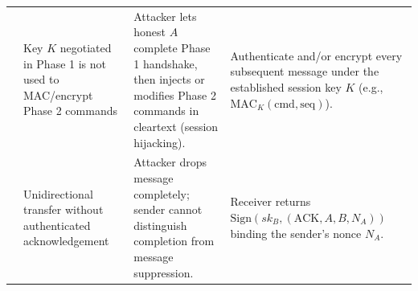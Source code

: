 \begin{table}[h!]
\begin{tabularx}{\textwidth}{@{}L{2.6cm} L{3.8cm} Y Y@{}}
 & Key $K$ negotiated in Phase 1 is not used to MAC/encrypt Phase 2 commands & Attacker lets honest $A$ complete Phase 1 handshake, then injects or modifies Phase 2 commands in cleartext (session hijacking). & Authenticate and/or encrypt every subsequent message under the established session key $K$ (e.g., $\mathrm{MAC}_K(\text{cmd}, \text{seq})$). \\
 & Unidirectional transfer without authenticated acknowledgement & Attacker drops message completely; sender cannot distinguish completion from message suppression. & Receiver returns $\mathrm{Sign}(sk_B, (\text{ACK}, A, B, N_A))$ binding the sender's nonce $N_A$. \\
\bottomrule
\end{tabularx}
\end{table}

